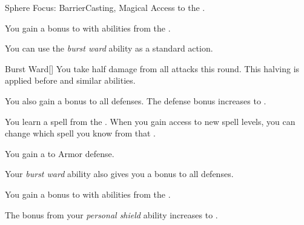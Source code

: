     \begin{feat}{Sphere Focus: Barrier}{Casting, Magical}
        \featpre Access to the  .

         You gain a  bonus to  with abilities from the  .

         You can use the \textit{burst ward} ability as a standard action.
        \begin{freeability}{Burst Ward}[]
            You take half damage from all attacks this round.
            This halving is applied before  and similar abilities.

            \rankline
             You also gain a  bonus to all defenses.
             The defense bonus increases to .
        \end{freeability}

         You learn a spell from the  .
        When you gain access to new spell levels, you can change which spell you know from that .

         You gain a   to Armor defense.

         Your \textit{burst ward} ability also gives you a  bonus to all defenses.

         You gain a  bonus to  with abilities from the  .

         The bonus from your \textit{personal shield} ability increases to .
    \end{feat}


